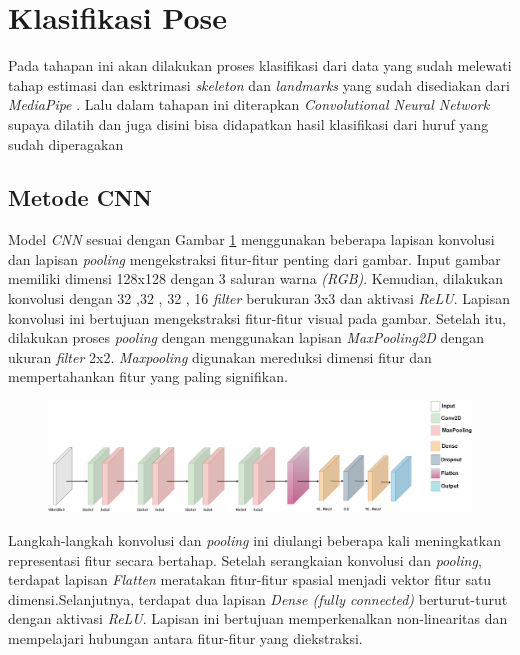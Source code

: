\section{Klasifikasi Pose}
Pada tahapan ini akan dilakukan proses klasifikasi dari data yang sudah melewati tahap estimasi dan esktrimasi \textit{skeleton} dan \textit{landmarks} yang sudah disediakan dari \textit{\textit{MediaPipe}} . Lalu dalam tahapan ini  diterapkan \textit{Convolutional Neural Network} supaya dilatih dan juga disini bisa didapatkan hasil klasifikasi dari huruf yang sudah diperagakan

\subsection{Metode CNN}
Model \textit{CNN} sesuai dengan Gambar \ref{fig:layerCNN} menggunakan beberapa lapisan konvolusi dan lapisan \textit{pooling} mengekstraksi fitur-fitur penting dari gambar. Input gambar memiliki dimensi 128x128 dengan 3 saluran warna \textit{(RGB)}. Kemudian, dilakukan konvolusi dengan 32 ,32 , 32 , 16 \textit{filter} berukuran 3x3 dan aktivasi \textit{ReLU}. Lapisan konvolusi ini bertujuan mengekstraksi fitur-fitur visual pada gambar. Setelah itu, dilakukan proses \textit{pooling} dengan menggunakan lapisan \textit{MaxPooling2D} dengan ukuran \textit{filter} 2x2. \textit{Maxpooling} digunakan mereduksi dimensi fitur dan mempertahankan fitur yang paling signifikan.
\begin{figure}[hbt!]
	\centering
	\includegraphics[width=1.0\linewidth]{gambar/bener/Arsitektur_CNN_Revisi.png}
	\label{fig:layerCNN}
\end{figure}
Langkah-langkah konvolusi dan \textit{pooling} ini diulangi beberapa kali meningkatkan representasi fitur secara bertahap. Setelah serangkaian konvolusi dan \textit{pooling}, terdapat lapisan \textit{Flatten} meratakan fitur-fitur spasial menjadi vektor fitur satu dimensi.Selanjutnya, terdapat dua lapisan \textit{{Dense} (fully connected)} berturut-turut dengan aktivasi \textit{ReLU}. Lapisan ini bertujuan memperkenalkan non-linearitas dan mempelajari hubungan antara fitur-fitur yang diekstraksi.

